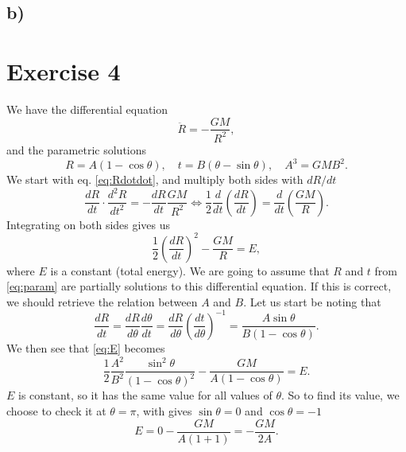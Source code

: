 \documentclass[a4paper,norsk, 10pt]{article}
\begin{document}
\subsection{b)}

\section{Exercise 4}



We have the differential equation 
\begin{equation}\label{eq:Rdotdot}
\ddot{R} = -\frac{GM}{R^2},
\end{equation}
and the parametric solutions 
\begin{equation}\label{eq:param}
R = A(1-\cos \theta), \quad t = B(\theta - \sin \theta), \quad A^3 = GMB^2.
\end{equation}
We start with eq. \eqref{eq:Rdotdot}, and multiply both sides with $dR/dt$
\begin{equation}
\frac{dR}{dt}\cdot \frac{d^2R}{dt^2} = - \frac{dR}{dt}\frac{GM}{R^2} \Leftrightarrow \frac{1}{2}\frac{d}{dt}\left(\frac{dR}{dt}\right) = \frac{d}{dt}\left(\frac{GM}{R}\right).
\end{equation}
Integrating on both sides gives us
\begin{equation}\label{eq:E}
\frac{1}{2}\left(\frac{dR}{dt}\right)^2 - \frac{GM}{R} = E,
\end{equation}
where $E$ is a constant (total energy). We are going to assume that $R$ and $t$ from \eqref{eq:param} are partially solutions to this differential equation. If this is correct, we should retrieve the relation between $A$ and $B$. Let us start be noting that
\begin{equation}\label{eq:dRdt}
\frac{dR}{dt} = \frac{dR}{d\theta}\frac{d\theta}{dt} = \frac{dR}{d\theta}\left(\frac{dt}{d\theta}\right)^{-1} = \frac{A\sin \theta}{B(1-\cos \theta)}.
\end{equation}
We then see that \eqref{eq:E} becomes
\begin{equation}\label{eq:E_param}
\frac{1}{2}\frac{A^2}{B^2}\frac{\sin^2 \theta}{(1-\cos \theta)^2} - \frac{GM}{A(1-\cos \theta)} = E.
\end{equation}
$E$ is constant, so it has the same value for all values of $\theta$. So to find its value, we choose to check it at $\theta = \pi$, with gives $\sin \theta = 0$ and $\cos \theta = -1$
\begin{equation}
E = 0 - \frac{GM}{A(1+1)} = -\frac{GM}{2A}.
\end{equation}
\end{document}

